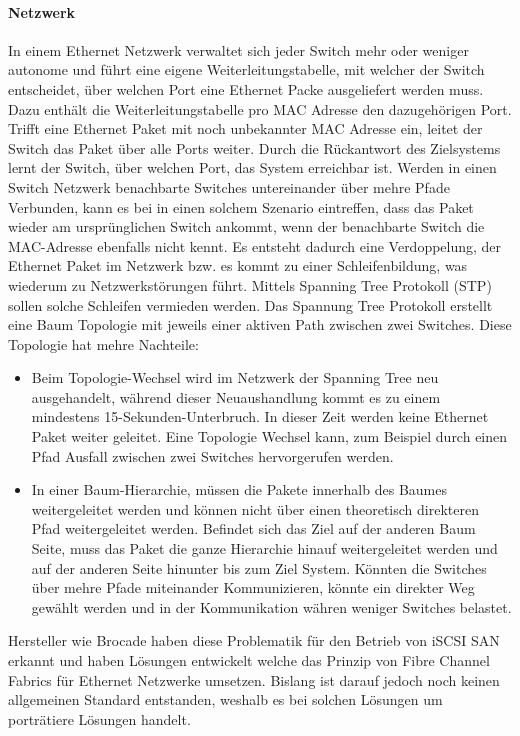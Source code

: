 \paragraph*{Netzwerk}
In einem Ethernet Netzwerk verwaltet sich jeder Switch mehr oder weniger autonome und führt eine eigene Weiterleitungstabelle, mit welcher der Switch entscheidet, über welchen Port eine Ethernet Packe ausgeliefert werden muss. Dazu enthält die Weiterleitungstabelle pro MAC Adresse den dazugehörigen Port. Trifft eine Ethernet Paket mit noch unbekannter MAC Adresse ein, leitet der Switch das Paket über alle Ports weiter. Durch die Rückantwort des Zielsystems lernt der Switch, über welchen Port, das System erreichbar ist. Werden in einen Switch Netzwerk benachbarte Switches untereinander über mehre Pfade Verbunden, kann es bei in einen solchem Szenario eintreffen, dass das Paket wieder am ursprünglichen Switch ankommt, wenn der benachbarte Switch die MAC-Adresse ebenfalls nicht kennt. Es entsteht dadurch eine Verdoppelung, der Ethernet Paket im Netzwerk bzw. es kommt zu einer Schleifenbildung, was wiederum zu Netzwerkstörungen führt. Mittels Spanning Tree Protokoll (STP) sollen solche Schleifen vermieden werden. Das Spannung Tree Protokoll erstellt eine Baum Topologie mit jeweils einer aktiven Path zwischen zwei Switches. Diese Topologie hat mehre Nachteile: 

\begin{itemize}
\item Beim Topologie-Wechsel wird im Netzwerk der Spanning Tree neu ausgehandelt, während dieser Neuaushandlung kommt es zu einem mindestens 15-Sekunden-Unterbruch. In dieser Zeit werden keine Ethernet Paket weiter geleitet. Eine Topologie Wechsel kann, zum Beispiel durch einen Pfad Ausfall zwischen zwei Switches hervorgerufen werden.

\item In einer Baum-Hierarchie, müssen die Pakete innerhalb des Baumes weitergeleitet werden und können nicht über einen theoretisch direkteren Pfad weitergeleitet werden. Befindet sich das Ziel auf der anderen Baum Seite, muss das Paket die ganze Hierarchie hinauf weitergeleitet werden und auf der anderen Seite hinunter bis zum Ziel System. Könnten die Switches über mehre Pfade miteinander Kommunizieren, könnte ein direkter Weg gewählt werden und in der Kommunikation währen weniger Switches belastet.
\end{itemize}

Hersteller wie Brocade haben diese Problematik für den Betrieb von iSCSI SAN erkannt und haben Lösungen entwickelt welche das Prinzip von Fibre Channel Fabrics für Ethernet Netzwerke umsetzen. Bislang ist darauf jedoch noch keinen allgemeinen Standard entstanden, weshalb es bei solchen Lösungen um porträtiere Lösungen handelt.

